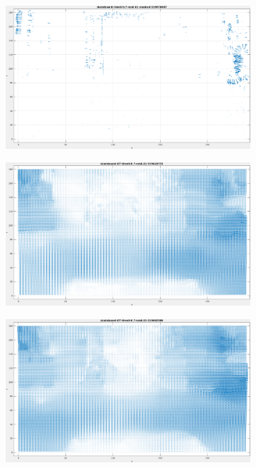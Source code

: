 \begin{figure}[tb]
\begin{subfigure}{.45\textwidth}
  \caption{}
\end{subfigure}
\begin{subfigure}{.45\textwidth}
  \centering
  \includegraphics[height=.6\linewidth]{figs/skateboard/skateboard-masked-2.png}
  \caption{}
\end{subfigure}
\begin{subfigure}{.45\textwidth}
  \centering
  \includegraphics[height=.6\linewidth]{figs/skateboard/skateboard-GT-1.png}
  \caption{}
\end{subfigure}
\begin{subfigure}{.45\textwidth}
  \centering
  \includegraphics[height=.6\linewidth]{figs/skateboard/skateboard-GT-2.png}

\end{subfigure}
\end{figure}
